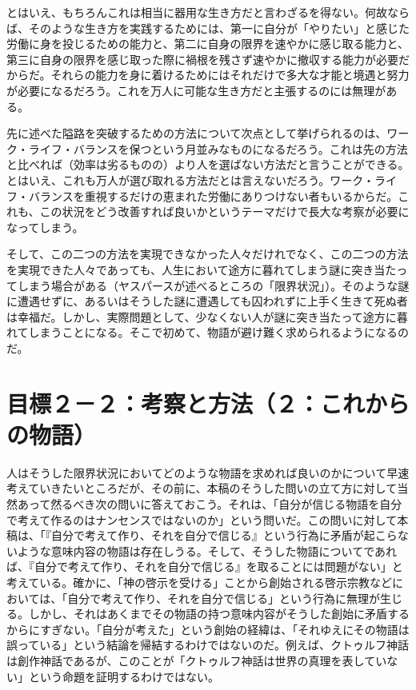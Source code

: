 \documentclass[8pt, a5paper]{ltjsarticle}
\begin{document}
とはいえ、もちろんこれは相当に器用な生き方だと言わざるを得ない。何故ならば、そのような生き方を実践するためには、第一に自分が「やりたい」と感じた労働に身を投じるための能力と、第二に自身の限界を速やかに感じ取る能力と、第三に自身の限界を感じ取った際に禍根を残さず速やかに撤収する能力が必要だからだ。それらの能力を身に着けるためにはそれだけで多大な才能と境遇と努力が必要になるだろう。これを万人に可能な生き方だと主張するのには無理がある。

先に述べた隘路を突破するための方法について次点として挙げられるのは、ワーク・ライフ・バランスを保つという月並みなものになるだろう。これは先の方法と比べれば（効率は劣るものの）より人を選ばない方法だと言うことができる。とはいえ、これも万人が選び取れる方法だとは言えないだろう。ワーク・ライフ・バランスを重視するだけの恵まれた労働にありつけない者もいるからだ。これも、この状況をどう改善すれば良いかというテーマだけで長大な考察が必要になってしまう。

そして、この二つの方法を実現できなかった人々だけれでなく、この二つの方法を実現できた人々であっても、人生において途方に暮れてしまう謎に突き当たってしまう場合がある（ヤスパースが述べるところの「限界状況」）。そのような謎に遭遇せずに、あるいはそうした謎に遭遇しても囚われずに上手く生きて死ぬ者は幸福だ。しかし、実際問題として、少なくない人が謎に突き当たって途方に暮れてしまうことになる。そこで初めて、物語が避け難く求められるようになるのだ。

\section{目標２－２：考察と方法（２：これからの物語）}\label{ux76eeux6a19uxff12uxff12ux8003ux5bdfux3068ux65b9ux6cd5uxff12ux3053ux308cux304bux3089ux306eux7269ux8a9e}

人はそうした限界状況においてどのような物語を求めれば良いのかについて早速考えていきたいところだが、その前に、本稿のそうした問いの立て方に対して当然あって然るべき次の問いに答えておこう。それは、「自分が信じる物語を自分で考えて作るのはナンセンスではないのか」という問いだ。この問いに対して本稿は、「『自分で考えて作り、それを自分で信じる』という行為に矛盾が起こらないような意味内容の物語は存在しうる。そして、そうした物語についてであれば、『自分で考えて作り、それを自分で信じる』を取ることには問題がない」と考えている。確かに、「神の啓示を受ける」ことから創始される啓示宗教などにおいては、「自分で考えて作り、それを自分で信じる」という行為に無理が生じる。しかし、それはあくまでその物語の持つ意味内容がそうした創始に矛盾するからにすぎない。「自分が考えた」という創始の経緯は、「それゆえにその物語は誤っている」という結論を帰結するわけではないのだ。例えば、クトゥルフ神話は創作神話であるが、このことが「クトゥルフ神話は世界の真理を表していない」という命題を証明するわけではない。
\end{document}
